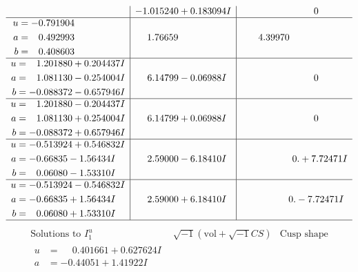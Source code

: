 \documentclass[1p]{elsarticle_modified}
\theoremstyle{definition}
\newcommand{\I}{\sqrt{-1}}
\begin{document}
$$\begin{array}{c|c|c}
 & -1.015240 + 0.183094 I & \phantom{-0.000000 } 0 \\ \hline\begin{aligned}
u &= -0.791904\phantom{ +0.000000I} \\
a &= \phantom{-}0.492993\phantom{ +0.000000I} \\
b &= \phantom{-}0.408603\phantom{ +0.000000I}\end{aligned}
 & \phantom{-}1.76659\phantom{ +0.000000I} & \phantom{-}4.39970\phantom{ +0.000000I} \\ \hline\begin{aligned}
u &= \phantom{-}1.201880 + 0.204437 I \\
a &= \phantom{-}1.081130 - 0.254004 I \\
b &= -0.088372 - 0.657946 I\end{aligned}
 & \phantom{-}6.14799 - 0.06988 I & \phantom{-0.000000 } 0 \\ \hline\begin{aligned}
u &= \phantom{-}1.201880 - 0.204437 I \\
a &= \phantom{-}1.081130 + 0.254004 I \\
b &= -0.088372 + 0.657946 I\end{aligned}
 & \phantom{-}6.14799 + 0.06988 I & \phantom{-0.000000 } 0 \\ \hline\begin{aligned}
u &= -0.513924 + 0.546832 I \\
a &= -0.66835 - 1.56434 I \\
b &= \phantom{-}0.06080 - 1.53310 I\end{aligned}
 & \phantom{-}2.59000 - 6.18410 I & \phantom{-0.000000 -}0. + 7.72471 I \\ \hline\begin{aligned}
u &= -0.513924 - 0.546832 I \\
a &= -0.66835 + 1.56434 I \\
b &= \phantom{-}0.06080 + 1.53310 I\end{aligned}
 & \phantom{-}2.59000 + 6.18410 I & \phantom{-0.000000 } 0. - 7.72471 I\\
 \hline 
 \end{array}$$\newpage$$\begin{array}{c|c|c}  
\text{Solutions to }I^u_{1}& \I (\text{vol} + \sqrt{-1}CS) & \text{Cusp shape}\\
 \hline 
\begin{aligned}
u &= \phantom{-}0.401661 + 0.627624 I \\
a &= -0.44051 + 1.41922 I \\

\end{aligned}
\end{array}$$
\end{document}
